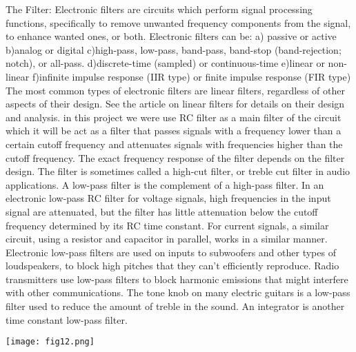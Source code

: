 \documentclass[11pt]{article}
\begin{document}
 The Filter:\newline
Electronic filters are circuits which perform signal processing functions, specifically to remove unwanted frequency components from the signal, to enhance wanted ones, or both. Electronic filters can be:\newline
 a) passive or active\newline
 b)analog or digital \newline
 c)high-pass, low-pass, band-pass, band-stop (band-rejection; notch), or all-pass.\newline
 d)discrete-time (sampled) or continuous-time\newline
 e)linear or non-linear\newline
 f)infinite impulse response (IIR type) or finite impulse response (FIR type)\newline
The most common types of electronic filters are linear filters, regardless of other aspects of their design. See the article on linear filters for details on their design and analysis.\newline
in this project we were use RC filter as a main filter of the circuit which it will be act as a filter that passes signals with a frequency lower than a certain cutoff frequency and attenuates signals with frequencies higher than the cutoff frequency. The exact frequency response of the filter depends on the filter design. The filter is sometimes called a high-cut filter, or treble cut filter in audio applications. A low-pass filter is the complement of a high-pass filter.\newline
In an electronic low-pass RC filter for voltage signals, high frequencies in the input signal are attenuated, but the filter has little attenuation below the cutoff frequency determined by its RC time constant. For current signals, a similar circuit, using a resistor and capacitor in parallel, works in a similar manner.
Electronic low-pass filters are used on inputs to subwoofers and other types of loudspeakers, to block high pitches that they can't efficiently reproduce. Radio transmitters use low-pass filters to block harmonic emissions that might interfere with other communications. The tone knob on many electric guitars is a low-pass filter used to reduce the amount of treble in the sound. An integrator is another time constant low-pass filter.\newline

\begin {center}
\texttt{[image: fig12.png]}\newline
\end{center}
\end{document}

